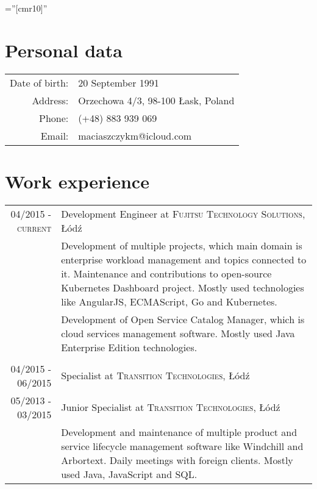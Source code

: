 \documentclass[a4paper,10pt]{article}
\begin{document}
\font\fb=''[cmr10]'' 
\par{}

\section{Personal data}

\begin{tabular}{rl}
    Date of birth: & 20 September 1991 \\
    Address: & Orzechowa 4/3, 98-100 Łask, Poland \\
    Phone: & (+48) 883 939 069\\
    Email: & maciaszczykm@icloud.com
\end{tabular}

\section{Work experience}

\begin{tabular}{r|p{11cm}}

  \textsc{04/2015 - current} & Development Engineer at \textsc{Fujitsu Technology Solutions}, Łódź \\
 & \footnotesize{Development of multiple projects, which main domain is enterprise workload management and topics connected to it. Maintenance and contributions to open-source Kubernetes Dashboard project. Mostly used technologies like AngularJS, ECMAScript, Go and Kubernetes.}\\
 & \footnotesize{Development of Open Service Catalog Manager, which is cloud services management software. Mostly used Java Enterprise Edition technologies.}\\\multicolumn{2}{c}{} \\
 
 \textsc{04/2015 - 06/2015} & Specialist at \textsc{Transition Technologies}, Łódź \\
  \textsc{05/2013 - 03/2015} & Junior Specialist at \textsc{Transition Technologies}, Łódź \\
 & \footnotesize{Development and maintenance of multiple product and service lifecycle management software like Windchill and Arbortext. Daily meetings with foreign clients. Mostly used Java, JavaScript and SQL.}\\
 
\end{tabular}
\end{document}
